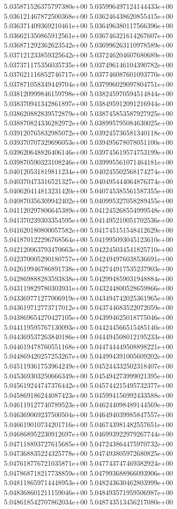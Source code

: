 5.035871526375797380e+00
5.035996497124144433e+00
5.036121467872500368e+00
5.036246438620855415e+00
5.036371409369210461e+00
5.036496380117566396e+00
5.036621350865912561e+00
5.036746321614267607e+00
5.036871292362623542e+00
5.036996263110978589e+00
5.037121233859325642e+00
5.037246204607680689e+00
5.037371175356035735e+00
5.037496146104390782e+00
5.037621116852746717e+00
5.037746087601093770e+00
5.037871058349449704e+00
5.037996029097804751e+00
5.038120999846159798e+00
5.038245970594514844e+00
5.038370941342861897e+00
5.038495912091216944e+00
5.038620882839572879e+00
5.038745853587927925e+00
5.038870824336282972e+00
5.038995795084630025e+00
5.039120765832985072e+00
5.039245736581340118e+00
5.039370707329696053e+00
5.039495678078051100e+00
5.039620648826406146e+00
5.039745619574753199e+00
5.039870590323108246e+00
5.039995561071464181e+00
5.040120531819811234e+00
5.040245502568174274e+00
5.040370473316521327e+00
5.040495444064876374e+00
5.040620414813231420e+00
5.040745385561587355e+00
5.040870356309942402e+00
5.040995327058289455e+00
5.041120297806645389e+00
5.041245268554999548e+00
5.041370239303354595e+00
5.041495210051702536e+00
5.041620180800057582e+00
5.041745151548412629e+00
5.041870122296768564e+00
5.041995093045123610e+00
5.042120063793470663e+00
5.042245034541825710e+00
5.042370005290180757e+00
5.042494976038536691e+00
5.042619946786891738e+00
5.042744917535237903e+00
5.042869888283593838e+00
5.042994859031948884e+00
5.043119829780303931e+00
5.043244800528659866e+00
5.043369771277006919e+00
5.043494742025361965e+00
5.043619712773717012e+00
5.043744683522072059e+00
5.043869654270427105e+00
5.043994625018775046e+00
5.044119595767130093e+00
5.044244566515485140e+00
5.044369537263840186e+00
5.044494508012195233e+00
5.044619478760551168e+00
5.044744449508898221e+00
5.044869420257253267e+00
5.044994391005609202e+00
5.045119361753964249e+00
5.045244332502318407e+00
5.045369303250666349e+00
5.045494273999021395e+00
5.045619244747376442e+00
5.045744215495732377e+00
5.045869186244087423e+00
5.045994156992433588e+00
5.046119127740789523e+00
5.046244098489144569e+00
5.046369069237500504e+00
5.046494039985847557e+00
5.046619010734201716e+00
5.046743981482557651e+00
5.046868952230912697e+00
5.046993922979267744e+00
5.047118893727615685e+00
5.047243864475970732e+00
5.047368835224325778e+00
5.047493805972680825e+00
5.047618776721035871e+00
5.047743747469382924e+00
5.047868718217738859e+00
5.047993688966093906e+00
5.048118659714448953e+00
5.048243630462803999e+00
5.048368601211159046e+00
5.048493571959506987e+00
5.048618542707862034e+00
5.048743513456217080e+00

